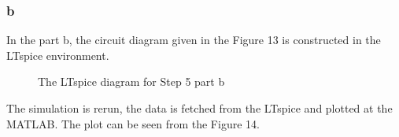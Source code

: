 \documentclass[letterpaper,12pt]{article}
\begin{document}
\subsubsection{b}
In the part b, the circuit diagram given in the Figure 13 is constructed in the LTspice environment.

\begin{figure}[H] 
	\caption{The LTspice diagram for Step 5 part b}
\end{figure}
The simulation is rerun, the data is fetched from the LTspice and plotted at the MATLAB. The plot can be seen from the Figure 14.
\end{document}
